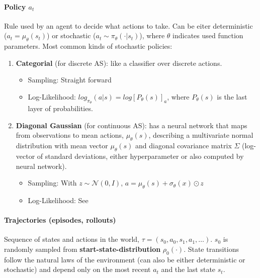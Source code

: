 \paragraph{Policy $a_t$} Rule used by an agent to decide what actions to take. Can be eiter deterministic ($a_t = \mu_{\theta}(s_t)$) or stochastic ($a_t \sim \pi_{\theta}(\cdot|s_t)$), where $\theta$ indicates used function parameters. Most common kinds of stochastic policies:
\begin{enumerate}
    \item
        \textbf{Categorial} (for discrete AS): like a classifier over discrete actions.
        \begin{itemize} 
            \item
                Sampling: Straight forward
            \item
                Log-Likelihood: $log_{\pi_{\theta}}(a|s) = log[P_{\theta}(s)]_a$, where $P_{\theta}(s)$ is the last layer of probabilities.
        \end{itemize}
    \item
        \textbf{Diagonal Gaussian} (for continuous AS): has a neural network that maps from observations to mean actions, $\mu_{\theta}(s)$, describing a multivariate normal distribution with mean vector $\mu_{\theta}(s)$ and diagonal covariance matrix $\Sigma$ (log-vector of standard deviations, either hyperparameter or also computed by neural network).
        \begin{itemize}
            \item
                Sampling: With $z \sim \mathcal{N}(0, I)$, $a = \mu_{\theta}(s) + \sigma_{\theta}(x) \odot z$
            \item
                Log-Likelihood: See \cite{rl-openai}
        \end{itemize}
\end{enumerate}
\paragraph{Trajectories (episodes, rollouts)} Sequence of states and actions in the world, $\tau = (s_0, a_0, s_1, a_1, \dots)$. $s_0$ is randomly sampled from \textbf{start-state-distribution} $\rho_0(\cdot)$. State transitions follow the natural laws of the environment (can also be either deterministic or stochastic) and depend only on the most recent $a_t$ and the last state $s_t$.

